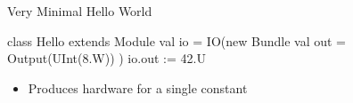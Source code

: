 \begin{frame}[fragile]{Very Minimal Hello World}
\begin{chisel}
class Hello extends Module {
  val io = IO(new Bundle {
    val out = Output(UInt(8.W))
  })
  io.out := 42.U
}
\end{chisel}
\begin{itemize}
\item Produces hardware for a single constant
\end{itemize}
\end{frame}


%


